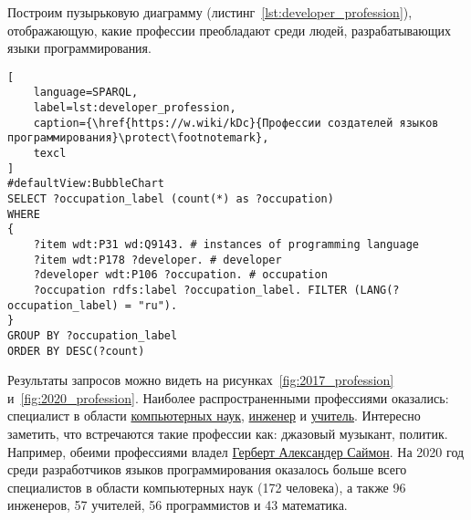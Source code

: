 \begin{marginfigure}[-302pt]
{
\setlength{\fboxsep}{0pt}
\setlength{\fboxrule}{1pt}
}
  \caption{Профессии людей, которые разрабатывают языки программирования (2017).}
  \label{fig:2017_profession}
\end{marginfigure}
\begin{marginfigure}[-52pt]
{
\setlength{\fboxsep}{0pt}
\setlength{\fboxrule}{1pt}
}
  \caption{Профессии людей, которые разрабатывают языки программирования (2020).}
  \label{fig:2020_profession}
\end{marginfigure}
Построим пузырьковую диаграмму (листинг~\ref{lst:developer_profession}), отображающую, какие профессии преобладают среди людей, разрабатывающих языки программирования.

\begin{lstlisting}[
	language=SPARQL,
	label=lst:developer_profession,
	caption={\href{https://w.wiki/kDc}{Профессии создателей языков программирования}\protect\footnotemark},
	texcl
]
#defaultView:BubbleChart
SELECT ?occupation_label (count(*) as ?occupation)
WHERE
{
    ?item wdt:P31 wd:Q9143. # instances of programming language 
    ?item wdt:P178 ?developer. # developer
    ?developer wdt:P106 ?occupation. # occupation
    ?occupation rdfs:label ?occupation_label. FILTER (LANG(?occupation_label) = "ru"). 
}
GROUP BY ?occupation_label 
ORDER BY DESC(?count)
\end{lstlisting}


Результаты запросов можно видеть на рисунках~\ref{fig:2017_profession} и~\ref{fig:2020_profession}.
Наиболее распространенными профессиями оказались: специалист в области \href{https://www.wikidata.org/wiki/Q21198}{компьютерных наук}, \href{https://www.wikidata.org/wiki/Q81096}{инженер} и \href{https://www.wikidata.org/wiki/Q37226}{учитель}. Интересно заметить, что встречаются такие профессии как: джазовый музыкант, политик. Например, обеими профессиями владел \href{https://www.wikidata.org/wiki/Q181529}{Герберт Александер Саймон}. На 2020 год среди разработчиков языков программирования оказалось больше всего специалистов в области компьютерных наук (172 человека), а также 96 инженеров, 57 учителей, 56 программистов и 43 математика.

